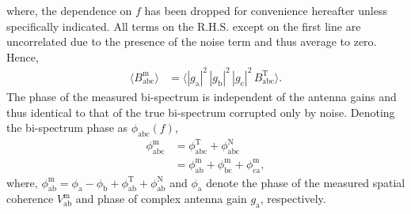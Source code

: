 \documentclass[
reprint,
superscriptaddress,
amsmath,
amssymb,
aps,
]{revtex4-1}
\begin{document}
where, the dependence on $f$ has been dropped for convenience hereafter unless specifically indicated. All terms on the R.H.S. except on the first line are uncorrelated due to the presence of the noise term and thus average to zero. Hence, 
\begin{align}
  \langle B_\textrm{abc}^\textrm{m}\rangle &= \langle |g_\textrm{a}|^2\, |g_\textrm{b}|^2\, |g_\textrm{c}|^2\, B_\textrm{abc}^\textrm{T}\rangle.
\end{align}
The phase of the measured bi-spectrum is independent of the antenna gains and thus identical to that of the true bi-spectrum corrupted only by noise. Denoting the bi-spectrum phase as $\phi_\textrm{abc}(f)$, 
\begin{align}
  \phi_\textrm{abc}^\textrm{m} &= \phi_\textrm{abc}^\textrm{T} + \phi_\textrm{abc}^\textrm{N} \label{eqn:cpphase-sum-sky-noise} \\
  &= \phi_\textrm{ab}^\textrm{m} + \phi_\textrm{bc}^\textrm{m} + \phi_\textrm{ca}^\textrm{m} \label{eqn:cpphase-sum-of-visphases},
\end{align}
where, $\phi_\textrm{ab}^\textrm{m} = \phi_\textrm{a} - \phi_\textrm{b} + \phi_\textrm{ab}^\textrm{T} + \phi_\textrm{ab}^\textrm{N}$ and $\phi_\textrm{a}$ denote the phase of the measured spatial coherence $V_\textrm{ab}^\textrm{m}$ and phase of complex antenna gain $g_\textrm{a}$, respectively. 
\end{document}
